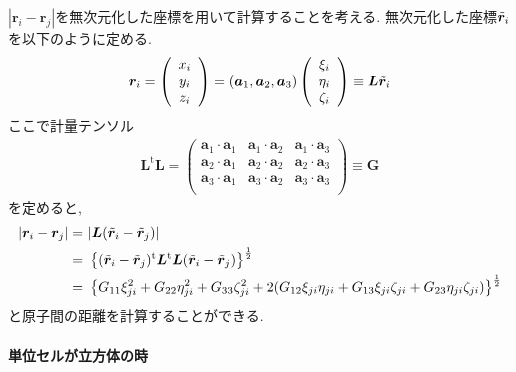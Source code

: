 $|\bm{r}_{i} - \bm{r}_{j}|$を無次元化した座標を用いて計算することを考える.
無次元化した座標$\Tilde{\bm{r}}_{i}$を以下のように定める.
\begin{align}
   \bm{r}_{i}
 =
   \left(
          \begin{array}{c}
            x_{i} \\ y_{i} \\ z_{i}
          \end{array}
   \right)
 =
  (\bm{a}_{1}, \bm{a}_{2}, \bm{a}_{3})
   \left(
          \begin{array}{c}
            \xi_{i} \\ \eta_{i} \\ \zeta_{i}
          \end{array}
   \right)
 \equiv
   \bm{L}\Tilde{\bm{r}}_{i}
\end{align}
ここで計量テンソル
\begin{align}
   \bm{L}^{\mathrm{t}} \bm{L}
 =
    \left(
          \begin{array}{ccc}
           \bm{a}_{1} \cdot \bm{a}_{1} & \bm{a}_{1} \cdot \bm{a}_{2} & \bm{a}_{1} \cdot \bm{a}_{3} \\
           \bm{a}_{2} \cdot \bm{a}_{1} & \bm{a}_{2} \cdot \bm{a}_{2} & \bm{a}_{2} \cdot \bm{a}_{3} \\
           \bm{a}_{3} \cdot \bm{a}_{1} & \bm{a}_{3} \cdot \bm{a}_{2} & \bm{a}_{3} \cdot \bm{a}_{3} \\
          \end{array}
   \right)
　 \equiv
 \bm{G}
\end{align}
を定めると,
\begin{align}
     |\bm{r}_{i} - \bm{r}_{j}|
 =&~
     |\bm{L} (\Tilde{\bm{r}}_{i} - \Tilde{\bm{r}}_{j})|
 \notag
 \\
 =&~
   \left\{ (\Tilde{\bm{r}}_{i} - \Tilde{\bm{r}}_{j})^{\mathrm{t}} \bm{L}^{\mathrm{t}}
            \bm{L} (\Tilde{\bm{r}}_{i} - \Tilde{\bm{r}}_{j})
   \right\}^{\frac{1}{2}}
 \notag
 \\
 =&~
   \left\{
      G_{11} \xi_{ji}^{2} + G_{22} \eta_{ji}^{2} + G_{33} \zeta_{ji}^{2}
  + 2(G_{12} \xi_{ji} \eta_{ji} + G_{13} \xi_{ji} \zeta_{ji} + G_{23} \eta_{ji} \zeta_{ji})
   \right\}^{\frac{1}{2}}
\end{align}
と原子間の距離を計算することができる.
\paragraph{単位セルが立方体の時} \


